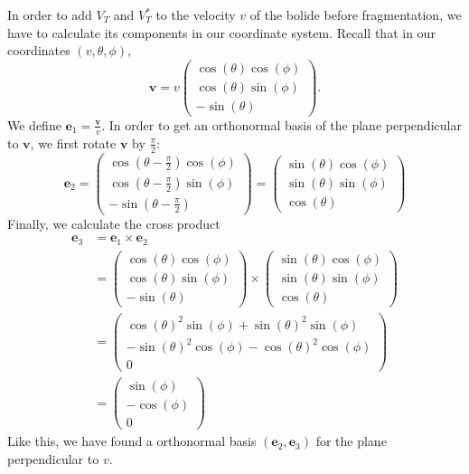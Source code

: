In order to add $V_T$ and $V_T^*$ to the velocity $v$ of the bolide before fragmentation,
we have to calculate its components in our coordinate system.
Recall that in our coordinates $(v, \theta, \phi)$,
\begin{equation*}
    \pmb{v} = v \begin{pmatrix}
        \cos(\theta)\cos(\phi) \\
        \cos(\theta)\sin(\phi) \\
        -\sin(\theta)
    \end{pmatrix}.
\end{equation*}
We define $\pmb{e}_1 = \frac{\pmb{v}}{v}$.
In order to get an orthonormal basis of the plane perpendicular to $\pmb{v}$, we first rotate $\pmb{v}$ by $\frac{\pi}{2}$:
\begin{equation*}
    \pmb{e}_2 = \begin{pmatrix}
        \cos\left(\theta - \frac{\pi}{2}\right)\cos(\phi) \\
        \cos\left(\theta - \frac{\pi}{2}\right)\sin(\phi) \\
        -\sin\left(\theta - \frac{\pi}{2}\right)
    \end{pmatrix} = \begin{pmatrix}
        \sin(\theta)\cos(\phi) \\
        \sin(\theta)\sin(\phi) \\
        \cos(\theta)
    \end{pmatrix}
\end{equation*}
Finally, we calculate the cross product
\begin{align*}
    \pmb{e}_3 &= \pmb{e}_1 \times \pmb{e}_2 \\
    &= \begin{pmatrix}
        \cos(\theta)\cos(\phi) \\
        \cos(\theta)\sin(\phi) \\
        -\sin(\theta)
    \end{pmatrix} \times \begin{pmatrix}
        \sin(\theta)\cos(\phi) \\
        \sin(\theta)\sin(\phi) \\
        \cos(\theta)
    \end{pmatrix} \\
    &= \begin{pmatrix}
        \cos(\theta)^2\sin(\phi) + \sin(\theta)^2\sin(\phi) \\
        -\sin(\theta)^2\cos(\phi) - \cos(\theta)^2\cos(\phi) \\
        0
    \end{pmatrix} \\
    &= \begin{pmatrix}
        \sin(\phi) \\
        -\cos(\phi) \\
        0
    \end{pmatrix}
\end{align*}
Like this, we have found a orthonormal basis $(\pmb{e}_2, \pmb{e}_3)$ for the plane perpendicular to $v$.

